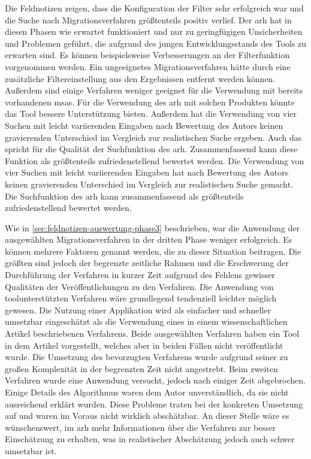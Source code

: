 Die Feldnotizen zeigen, dass die Konfiguration der Filter sehr erfolgreich war und die Suche nach Migrationsverfahren größtenteils positiv verlief.
Der \gls{arh} hat in diesen Phasen wie er\-war\-tet funktioniert und nur zu geringfügigen Unsicherheiten und Problemen geführt, die aufgrund des jungen Entwicklungsstands des Tools zu erwarten sind.
Es können beispielsweise Verbesserungen an der Filterfunktion vorgenommen werden.
Ein ungeeignetes Migrationsverfahren hätte durch eine zusätzliche Filtereinstellung aus den Ergebnissen entfernt werden können.
Außerdem sind einige Verfahren weniger geeignet für die Verwendung mit bereits vorhandenen \glspl{msa}.
Für die Verwendung des \gls{arh} mit solchen Produkten könnte das Tool bessere Unterstützung bieten.
Außerdem hat die Verwendung von vier Suchen mit leicht variierenden Eingaben nach Bewertung des Autors keinen gravierenden Unterschied im Vergleich zur realistischen Suche ergeben.
Auch das spricht für die Qualität der Suchfunktion des \gls{arh}.
Zusammenfassend kann diese Funktion als größtenteils zufriedenstellend bewertet werden.
Die Verwendung von vier Suchen mit leicht variierenden Eingaben hat nach Bewertung des Autors keinen gravierenden Unterschied im Vergleich zur realistischen Suche gemacht.
Die Suchfunktion des \gls{arh} kann zusammenfassend als größtenteils zufriedenstellend bewertet werden.

Wie in \cref{sec:feldnotizen-auswertung-phase3} beschrieben, war die Anwendung der ausgewählten Migrationsverfahren in der dritten Phase weniger erfolgreich.
Es können mehrere Faktoren genannt werden, die zu dieser Situation beitragen.
Die größten sind jedoch der begrenzte zeitliche Rahmen und die Erschwerung der Durchführung der Verfahren in kurzer Zeit aufgrund des Fehlens gewisser Qualitäten der Veröffentlichungen zu den Verfahren.
Die Anwendung von toolunterstützten Verfahren wäre grundlegend tendenziell leichter möglich gewesen.
Die Nutzung einer Applikation wird als einfacher und schneller umsetzbar eingeschätzt als die Verwendung eines in einem wissenschaftlichen Artikel beschriebenen Verfahrens.
Beide ausgewählten Verfahren haben ein Tool in dem Artikel vorgestellt, welches aber in beiden Fällen nicht veröffentlicht wurde.
Die Umsetzung des bevorzugten Verfahrens wurde aufgrund seiner zu großen Komplexität in der begrenzten Zeit nicht angestrebt.
Beim zweiten Verfahren wurde eine Anwendung versucht, jedoch nach einiger Zeit abgebrochen.
Einige Details des Algorithmus waren dem Autor unverständlich, da sie nicht ausreichend erklärt wurden.
Diese Probleme traten bei der konkreten Umsetzung auf und waren im Voraus nicht wirklich abschätzbar.
An dieser Stelle wäre es wünschenswert, im \gls{arh} mehr Informationen über die Verfahren zur besser Einschätzung zu erhalten, was in realistischer Abschätzung jedoch auch schwer umsetzbar ist.

